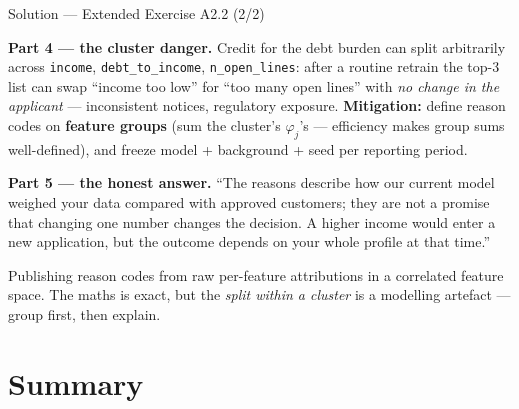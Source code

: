 \documentclass[aspectratio=169,11pt]{beamer}
\begin{document}
\begin{frame}{Solution --- Extended Exercise A2.2 (2/2)}
\begin{solutionbox}
  \textbf{Part 4 --- the cluster danger.} Credit for the debt burden can split
  arbitrarily across \texttt{income}, \texttt{debt\_to\_income},
  \texttt{n\_open\_lines}: after a routine retrain the top-3 list can swap
  ``income too low'' for ``too many open lines'' with \emph{no change in the
  applicant} --- inconsistent notices, regulatory exposure. \textbf{Mitigation:}
  define reason codes on \textbf{feature groups} (sum the cluster's $\varphi_j$'s
  --- efficiency makes group sums well-defined), and freeze model + background +
  seed per reporting period.

  \smallskip
  \textbf{Part 5 --- the honest answer.} ``The reasons describe how our current
  model weighed your data compared with approved customers; they are not a promise
  that changing one number changes the decision. A higher income would enter a new
  application, but the outcome depends on your whole profile at that time.''
\end{solutionbox}
\begin{mistake}
  Publishing reason codes from raw per-feature attributions in a correlated feature
  space. The maths is exact, but the \emph{split within a cluster} is a modelling
  artefact --- group first, then explain.
\end{mistake}
\end{frame}

\section{Summary}
\end{document}
